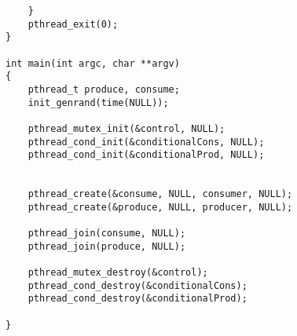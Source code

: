 \documentclass[letterpaper,10pt,titlepage,draftclsnofoot,onecolumn]{IEEEtran}
\begin{document}
\begin{lstlisting}
	}
	pthread_exit(0);
}

int main(int argc, char **argv) 
{
	pthread_t produce, consume;
	init_genrand(time(NULL));

	pthread_mutex_init(&control, NULL);
	pthread_cond_init(&conditionalCons, NULL); 
	pthread_cond_init(&conditionalProd, NULL); 


	pthread_create(&consume, NULL, consumer, NULL);
	pthread_create(&produce, NULL, producer, NULL);

	pthread_join(consume, NULL);
	pthread_join(produce, NULL);

	pthread_mutex_destroy(&control); 
	pthread_cond_destroy(&conditionalCons); 
	pthread_cond_destroy(&conditionalProd); 

}

\end{lstlisting} 
\end{document}
